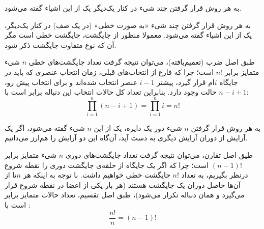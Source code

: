 
\begin{definition}
    به هر روش قرار گرفتن چند شیء در کنار یک‌دیگر یک 
    از این اشیاء گفته می‌شود.
\end{definition}


\begin{definition}
    به هر روش قرار گرفتن چند شیء «به صورت خطی» (در یک صف) در کنار یک‌دیگر، یک
    از این اشیاء گفته می‌شود.
    معمولا منظور از جایگشت، جایگشت خطی است مگر آن که نوع متفاوت جایگشت ذکر شود.
\end{definition}

\begin{fact}
    طبق اصل ضرب (تعمیم‌یافته)، می‌توان نتیجه گرفت
    تعداد جایگشت‌های خطی $n$ شیء متمایز برابر $n!$ است؛
    چرا که فارغ از انتخاب‌های قبلی، زمان انتخاب عنصری که باید در جایگاه
    $i$ام
    قرار گیرد، پیشتر
    $i-1$
    عنصر انتخاب شده‌اند و برای انتخاب پیش رو،
    $n-i+1$
    حالت وجود دارد. بنابراین تعداد کل حالات انتخاب این دنباله برابر است با:
    $$\prod\limits_{i=1}^n (n-i+1) = \prod\limits_{i=1}^n i = n!$$
\end{fact}


\begin{definition}
    به هر روش قرار گرفتن
    $n$
    شیء دور یک دایره، یک 
    از این
    $n$
    شیء
    گفته می‌شود،
    اگر یک آرایش از دوران آرایش دیگری به دست آید، آن‌گاه این دو آرایش را هم‌ارز می‌دانیم.
\end{definition}


\begin{fact}
    طیق اصل تقارن، می‌توان نتیجه گرفت
    تعداد جایگشت‌های دوری $n$ شیء متمایز برابر $(n-1)!$ است؛
    چرا که اگر یک جایگاه از حلقه‌ی جایگشت دوری را نقطه شروع درنظر بگیریم،
    به تعداد
    $n!$
    جایگشت خطی خواهیم داشت.
    با توجه به اینکه هر 
    $n$تا
    از آن‌ها حاصل دوران یک جایگشت هستند
    (هر بار یکی از اعضا در نقطه شروع قرار می‌گیرد و همان دنباله تکرار می‌شود)،
    طبق اصل تقسیم، تعداد حالات متمایز برابر است با :
    $$\frac{n!}{n} = (n-1)!$$
\end{fact}

